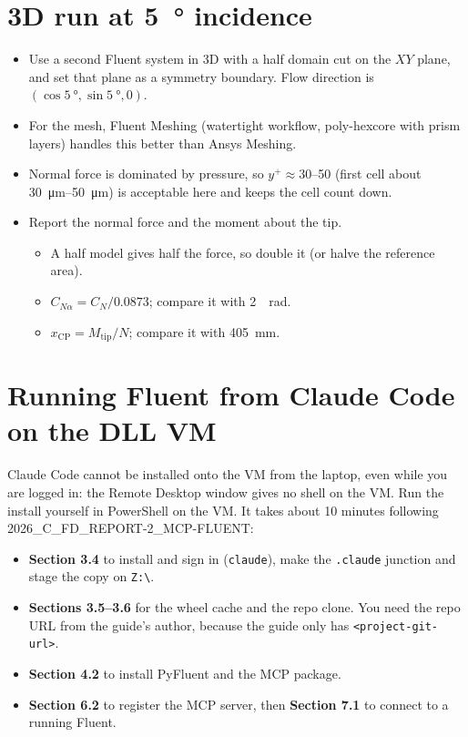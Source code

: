 \documentclass[11pt]{article}
\begin{document}
\section{\texorpdfstring{3D run at \SI{5}{\degree} incidence}{3D run at 5 deg incidence}}

\begin{itemize}
\item Use a second Fluent system in 3D with a half domain cut on the $XY$ plane, and set that plane as a
symmetry boundary. Flow direction is $(\cos\SI{5}{\degree}, \sin\SI{5}{\degree}, 0)$.
\item For the mesh, Fluent Meshing (watertight workflow, poly-hexcore with prism layers) handles this
better than Ansys Meshing.
\item Normal force is dominated by pressure, so $y^+ \approx 30$--50 (first cell about
\SIrange{30}{50}{\micro m}) is acceptable here and keeps the cell count down.
\item Report the normal force and the moment about the tip.
\begin{itemize}
\item A half model gives half the force, so double it (or halve the reference area).
\item $C_{N\alpha} = C_N / 0.0873$; compare it with \SI{2}{\per\radian}.
\item $x_{\mathrm{CP}} = M_{\mathrm{tip}} / N$; compare it with \SI{405}{mm}.
\end{itemize}
\end{itemize}

\section{Running Fluent from Claude Code on the DLL VM}

Claude Code cannot be installed onto the VM from the laptop, even while you are logged in: the Remote
Desktop window gives no shell on the VM. Run the install yourself in PowerShell on the VM. It takes about
10 minutes following 2026\_C\_FD\_REPORT-2\_MCP-FLUENT:
\begin{itemize}
\item \textbf{Section 3.4} to install and sign in (\texttt{claude}), make the \texttt{.claude} junction and
stage the copy on \texttt{Z:\textbackslash}.
\item \textbf{Sections 3.5--3.6} for the wheel cache and the repo clone. You need the repo URL from the
guide's author, because the guide only has \texttt{<project-git-url>}.
\item \textbf{Section 4.2} to install PyFluent and the MCP package.
\item \textbf{Section 6.2} to register the MCP server, then \textbf{Section 7.1} to connect to a running Fluent.
\end{itemize}
\end{document}
